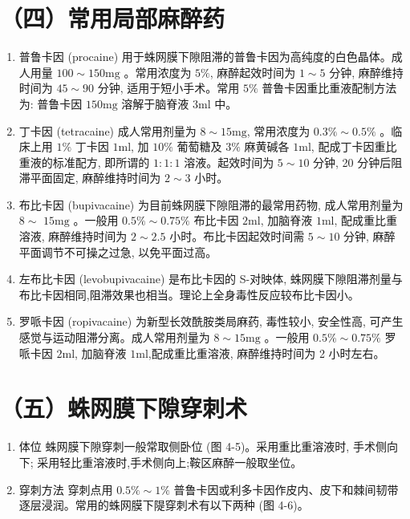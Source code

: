 \documentclass[10pt]{article}
\begin{document}
\section*{（四）常用局部麻醉药}
\begin{enumerate}
  \item 普鲁卡因 (procaine) 用于蛛网膜下隙阻滞的普鲁卡因为高纯度的白色晶体。成人用量 $100 \sim 150 \mathrm{mg}$ 。常用浓度为 $5 \%$, 麻醉起效时间为 $1 \sim 5$ 分钟, 麻醉维持时间为 $45 \sim 90$ 分钟, 适用于短小手术。常用 $5 \%$ 普鲁卡因重比重液配制方法为: 普鲁卡因 $150 \mathrm{mg}$ 溶解于脑脊液 $3 \mathrm{ml}$ 中。

  \item 丁卡因 (tetracaine) 成人常用剂量为 $8 \sim 15 \mathrm{mg}$, 常用浓度为 $0.3 \% \sim 0.5 \%$ 。临床上用 $1 \%$ 丁卡因 $1 \mathrm{ml}$, 加 $10 \%$ 葡萄糖及 $3 \%$ 麻黄碱各 $1 \mathrm{ml}$, 配成丁卡因重比重液的标准配方, 即所谓的 $1: 1: 1$ 溶液。起效时间为 $5 \sim 10$ 分钟, 20 分钟后阻滞平面固定, 麻醉维持时间为 $2 \sim 3$ 小时。

  \item 布比卡因 (bupivacaine) 为目前蛛网膜下隙阻滞的最常用药物, 成人常用剂量为 $8 \sim$ $15 \mathrm{mg}$ 。一般用 $0.5 \% \sim 0.75 \%$ 布比卡因 $2 \mathrm{ml}$, 加脑脊液 $1 \mathrm{ml}$, 配成重比重溶液, 麻醉维持时间为 $2 \sim 2.5$ 小时。布比卡因起效时间需 $5 \sim 10$ 分钟, 麻醉平面调节不可操之过急, 以免平面过高。

  \item 左布比卡因 (levobupivacaine) 是布比卡因的 S-对映体, 蛛网膜下隙阻滞剂量与布比卡因相同,阻滞效果也相当。理论上全身毒性反应较布比卡因小。

  \item 罗哌卡因 (ropivacaine) 为新型长效酰胺类局麻药, 毒性较小, 安全性高, 可产生感觉与运动阻滞分离。成人常用剂量为 $8 \sim 15 \mathrm{mg}$ 。一般用 $0.5 \% \sim 0.75 \%$ 罗哌卡因 $2 \mathrm{ml}$, 加脑脊液 $1 \mathrm{ml}$,配成重比重溶液, 麻醉维持时间为 2 小时左右。

\end{enumerate}

\section*{（五）蛛网膜下隙穿刺术}
\begin{enumerate}
  \item 体位 蛛网膜下隙穿刺一般常取侧卧位 (图 4-5)。采用重比重溶液时, 手术侧向下; 采用轻比重溶液时,手术侧向上;鞍区麻醉一般取坐位。

  \item 穿刺方法 穿刺点用 $0.5 \% \sim 1 \%$ 普鲁卡因或利多卡因作皮内、皮下和棘间韧带逐层浸润。常用的蛛网膜下隄穿刺术有以下两种 (图 4-6)。

\end{enumerate}
\end{document}
